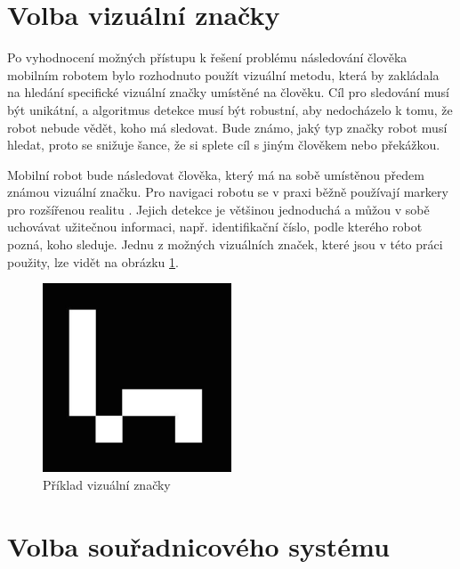 \documentclass[twoside]{ctuthesis}
\theoremstyle{plain}
\theoremstyle{definition}
\theoremstyle{note}
\begin{document}
\section{Volba vizuální značky}




Po vyhodnocení možných přístupu k řešení problému následování člověka mobilním robotem bylo rozhodnuto použít vizuální metodu, která by zakládala na hledání specifické vizuální značky umístěné na člověku. Cíl pro sledování musí být unikátní, a algoritmus detekce musí být robustní, aby nedocházelo k tomu, že robot nebude vědět, koho má sledovat. Bude známo, jaký typ značky robot musí hledat, proto se snižuje šance, že si splete cíl s jiným člověkem nebo překážkou. 

Mobilní robot bude následovat člověka, který má na sobě umístěnou předem známou vizuální značku. Pro navigaci robotu se v praxi běžně používají markery pro rozšířenou realitu \cite{cite:1}\cite{cite:2}\cite{cite:3}. Jejich detekce je většinou jednoduchá a můžou v sobě uchovávat užitečnou informaci, např. identifikační číslo, podle kterého robot pozná, koho sleduje. Jednu z možných vizuálních značek, které jsou v této práci použity, lze vidět na obrázku \ref{am}.

\begin{figure}[]
	\caption{Příklad vizuální značky}

	\label{am}
	\includegraphics[width=0.5\textwidth]{images/2/ArucoMarker.jpg}
\end{figure}


\section{Volba souřadnicového systému}
\label{ss_section}
\end{document}
